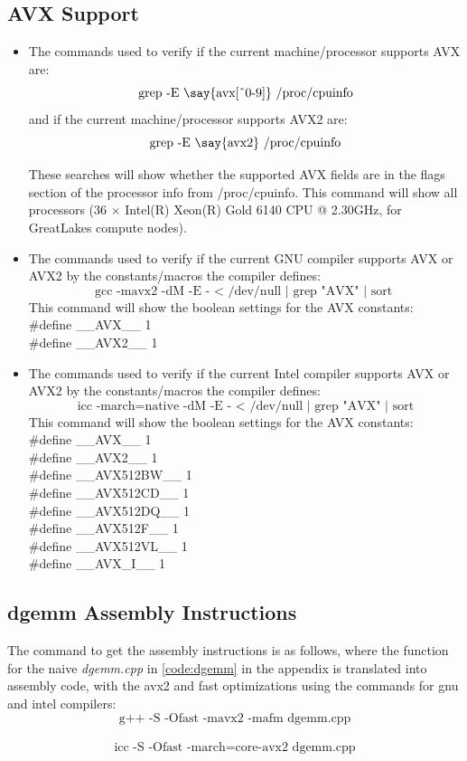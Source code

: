 \documentclass[letterpaper]{article}
\begin{document}
\subsection{AVX Support}
\begin{itemize}
	\item The commands used to verify if the current machine/processor supports AVX are:
	$$ \textrm{grep -E \say{avx[\^{}0-9]} /proc/cpuinfo}$$
	and if the current machine/processor supports AVX2 are:
	$$ \textrm{grep -E \say{avx2} /proc/cpuinfo}$$ 

	These searches will show whether the supported AVX fields are in the flags section of the processor info from /proc/cpuinfo. This command will show all processors (36 $\times$ Intel(R) Xeon(R) Gold 6140 CPU @ 2.30GHz, for GreatLakes compute nodes).
	
	\item The commands used to verify if the current GNU compiler supports AVX or AVX2 by the constants/macros the compiler defines:
	$$ \textrm{gcc -mavx2 -dM -E - < /dev/null | grep "AVX" | sort } $$
	This command will show the boolean settings for the AVX constants:\\
	\#define \_\_AVX\_\_ 1 \\
	\#define \_\_AVX2\_\_ 1 \\
	
	\item The commands used to verify if the current Intel compiler supports AVX or AVX2 by the constants/macros the compiler defines:
	$$\textrm{ icc -march=native -dM -E - < /dev/null | grep "AVX" | sort } $$
	This command will show the boolean settings for the AVX constants:\\
	\#define \_\_AVX\_\_ 1 \\
	\#define \_\_AVX2\_\_ 1 \\
	\#define \_\_AVX512BW\_\_ 1 \\
	\#define \_\_AVX512CD\_\_ 1 \\
	\#define \_\_AVX512DQ\_\_ 1 \\
	\#define \_\_AVX512F\_\_ 1 \\
	\#define \_\_AVX512VL\_\_ 1 \\
	\#define \_\_AVX\_I\_\_ 1 \\
\end{itemize}

\subsection{dgemm Assembly Instructions}
The command to get the assembly instructions is as follows, where the function for the naive \textit{dgemm.cpp} in \cref{code:dgemm} in the appendix is translated into assembly code, with the avx2 and fast optimizations using the commands for gnu and intel compilers:
$$\textrm{g++ -S -Ofast -mavx2 -mafm dgemm.cpp} $$ \\
$$\textrm{icc -S -Ofast -march=core-avx2 dgemm.cpp} $$ \\
\end{document}

